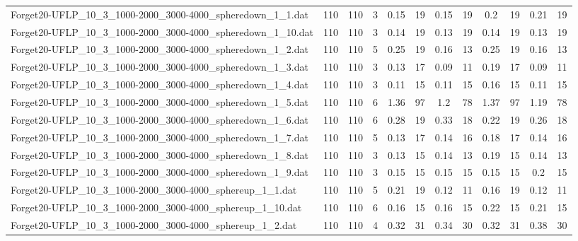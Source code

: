 \begin{sidewaystable}[!ht]
{\begin{tabular}{lccccccccccc}
Forget20-UFLP\_10\_3\_1000-2000\_3000-4000\_spheredown\_1\_1.dat & 110 & 110 & 3 & 0.15 & 19 & 0.15 & 19 & 0.2 & 19 & 0.21 & 19 \\
Forget20-UFLP\_10\_3\_1000-2000\_3000-4000\_spheredown\_1\_10.dat & 110 & 110 & 3 & 0.14 & 19 &  \textcolor{blue2}{0.13} & 19 & 0.14 & 19 &  \textcolor{blue2}{0.13} & 19 \\
Forget20-UFLP\_10\_3\_1000-2000\_3000-4000\_spheredown\_1\_2.dat & 110 & 110 & 5 & 0.25 & 19 &  \textcolor{blue2}{0.16} & 13 & 0.25 & 19 &  \textcolor{blue2}{0.16} & 13 \\
Forget20-UFLP\_10\_3\_1000-2000\_3000-4000\_spheredown\_1\_3.dat & 110 & 110 & 3 & 0.13 & 17 &  \textcolor{blue2}{0.09} & 11 & 0.19 & 17 &  \textcolor{blue2}{0.09} & 11 \\
Forget20-UFLP\_10\_3\_1000-2000\_3000-4000\_spheredown\_1\_4.dat & 110 & 110 & 3 &  \textcolor{blue2}{0.11} & 15 &  \textcolor{blue2}{0.11} & 15 & 0.16 & 15 &  \textcolor{blue2}{0.11} & 15 \\
Forget20-UFLP\_10\_3\_1000-2000\_3000-4000\_spheredown\_1\_5.dat & 110 & 110 & 6 & 1.36 & 97 & 1.2 & 78 & 1.37 & 97 &  \textcolor{blue2}{1.19} & 78 \\
Forget20-UFLP\_10\_3\_1000-2000\_3000-4000\_spheredown\_1\_6.dat & 110 & 110 & 6 & 0.28 & 19 & 0.33 & 18 &  \textcolor{blue2}{0.22} & 19 & 0.26 & 18 \\
Forget20-UFLP\_10\_3\_1000-2000\_3000-4000\_spheredown\_1\_7.dat & 110 & 110 & 5 & 0.13 & 17 & 0.14 & 16 & 0.18 & 17 & 0.14 & 16 \\
Forget20-UFLP\_10\_3\_1000-2000\_3000-4000\_spheredown\_1\_8.dat & 110 & 110 & 3 &  \textcolor{blue2}{0.13} & 15 & 0.14 & 13 & 0.19 & 15 & 0.14 & 13 \\
Forget20-UFLP\_10\_3\_1000-2000\_3000-4000\_spheredown\_1\_9.dat & 110 & 110 & 3 &  \textcolor{blue2}{0.15} & 15 &  \textcolor{blue2}{0.15} & 15 &  \textcolor{blue2}{0.15} & 15 & 0.2 & 15 \\
Forget20-UFLP\_10\_3\_1000-2000\_3000-4000\_sphereup\_1\_1.dat & 110 & 110 & 5 & 0.21 & 19 &  \textcolor{blue2}{0.12} & 11 & 0.16 & 19 &  \textcolor{blue2}{0.12} & 11 \\
Forget20-UFLP\_10\_3\_1000-2000\_3000-4000\_sphereup\_1\_10.dat & 110 & 110 & 6 &  \textcolor{blue2}{0.16} & 15 &  \textcolor{blue2}{0.16} & 15 & 0.22 & 15 & 0.21 & 15 \\
Forget20-UFLP\_10\_3\_1000-2000\_3000-4000\_sphereup\_1\_2.dat & 110 & 110 & 4 &  \textcolor{blue2}{0.32} & 31 & 0.34 & 30 &  \textcolor{blue2}{0.32} & 31 & 0.38 & 30 \\

\end{tabular}}
\end{sidewaystable}
